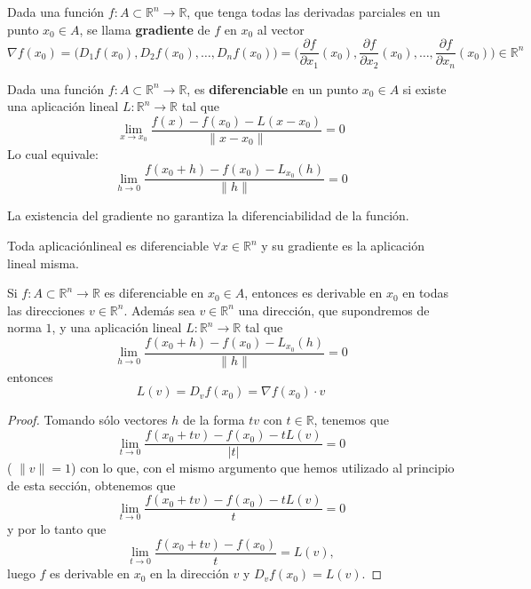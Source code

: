 \begin{definición}[Gradiente]
    Dada una función $f:A \subset \mathbb{R}^n \to \mathbb{R}$, que tenga todas las derivadas parciales en un punto $x_0\in A$, se llama \textbf{gradiente} de $f$ en $x_0$ al vector
    $$ \nabla f(x_0) = \bigl(D_1f(x_0), D_2f(x_0), \ldots, D_nf(x_0)\bigr) = \bigl(\frac{\partial f}{\partial x_1}(x_0), \frac{\partial f}{\partial x_2}(x_0), \ldots, \frac{\partial f}{\partial x_n}(x_0)\bigr) \in \mathbb{R}^n $$
\end{definición}

\begin{definición}[Diferenciable]
    Dada una función $f:A \subset \mathbb{R}^n \to \mathbb{R}$, es \textbf{diferenciable} en un punto $x_0\in A$ si existe una aplicación lineal $L:\mathbb{R}^n\to\mathbb{R}$ tal que
    $$ \lim_{x\to x_0} \frac{f(x) - f(x_0) - L(x-x_0)}{\|x-x_0\|} = 0 $$
    Lo cual equivale: 
    $$ \lim_{h \to 0} \frac{f(x_0 + h) - f(x_0) - L_{x_0}(h)}{\|h\|} = 0 $$
\end{definición}

\begin{observación}
    La existencia del gradiente no garantiza la diferenciabilidad de la función. 
\end{observación}

\begin{proposición}
    Toda aplicaciónlineal es diferenciable $\forall x \in \mathbb{R}^n$ y su gradiente es la aplicación lineal misma.
\end{proposición}

\begin{teorema}
    Si $f: A \subset \mathbb{R}^n \to \mathbb{R}$ es diferenciable en $x_0\in A$, entonces es derivable en $x_0$ en todas las direcciones $v\in\mathbb{R}^n$. Además sea $v \in \mathbb{R}^n$ una dirección, que supondremos de norma $1$, y una aplicación lineal $L:\mathbb{R}^n\to\mathbb{R}$ tal que
    $$\lim_{h \to 0} \frac{f(x_0 + h) - f(x_0) - L_{x_0}(h)}{\|h\|} = 0$$
    entonces
    $$ L(v) = D_vf(x_0) = \nabla f(x_0) \cdot v $$
\end{teorema}
\begin{proof}
    Tomando sólo vectores $h$ de la forma $tv$ con $t \in \mathbb{R}$, tenemos que
    \[
    \lim_{t \to 0} \frac{f(x_0 + tv) - f(x_0) - tL(v)}{|t|} = 0
    \]
    ( $\|v\| = 1$) con lo que, con el mismo argumento que hemos utilizado al principio de esta sección, obtenemos que
    \[
    \lim_{t \to 0} \frac{f(x_0 + tv) - f(x_0) - tL(v)}{t} = 0
    \]
    y por lo tanto que
    \[
    \lim_{t \to 0} \frac{f(x_0 + tv) - f(x_0)}{t} = L(v),
    \]
    luego $f$ es derivable en $x_0$ en la dirección $v$ y $D_v f(x_0) = L(v)$.
\end{proof}

